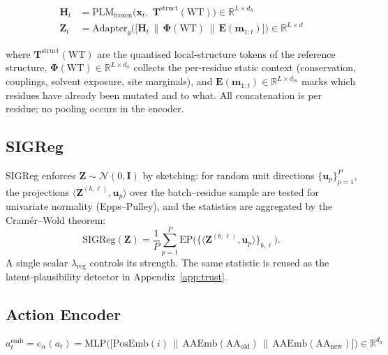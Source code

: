 \documentclass[12pt, a4paper]{article}
\begin{document}
\begin{align}
    \mathbf{H}_t &= \mathrm{PLM}_{\text{frozen}}\big(\mathbf{x}_t,\; \mathbf{T}^{\text{struct}}(\mathrm{WT})\big) \in \mathbb{R}^{L \times d_h} \\
    \mathbf{Z}_t &= \mathrm{Adapter}_\theta\Big(\big[\mathbf{H}_t \,\|\, \boldsymbol{\Phi}(\mathrm{WT}) \,\|\, \mathbf{E}(\mathbf{m}_{1:t})\big]\Big) \in \mathbb{R}^{L \times d}
\end{align}

\noindent where $\mathbf{T}^{\text{struct}}(\mathrm{WT})$ are the quantised local-structure tokens of the reference structure, $\boldsymbol{\Phi}(\mathrm{WT}) \in \mathbb{R}^{L \times d_\phi}$ collects the per-residue static context (conservation, couplings, solvent exposure, site marginals), and $\mathbf{E}(\mathbf{m}_{1:t}) \in \mathbb{R}^{L \times d_m}$ marks which residues have already been mutated and to what. All concatenation is per residue; no pooling occurs in the encoder.

\subsection{SIGReg}

SIGReg \citep{maes2026leworldmodel} enforces $\mathbf{Z} \sim \mathcal{N}(0, \mathbf{I})$ by sketching: for random unit directions $\{\mathbf{u}_p\}_{p=1}^{P}$, the projections $\langle \mathbf{Z}^{(b,\ell)}, \mathbf{u}_p \rangle$ over the batch--residue sample are tested for univariate normality (Epps--Pulley), and the statistics are aggregated by the Cram\'{e}r--Wold theorem:
\begin{equation}
    \mathrm{SIGReg}(\mathbf{Z}) = \frac{1}{P}\sum_{p=1}^{P} \mathrm{EP}\Big(\big\{\langle \mathbf{Z}^{(b,\ell)}, \mathbf{u}_p\rangle\big\}_{b,\ell}\Big).
\end{equation}
A single scalar $\lambda_\text{reg}$ controls its strength. The same statistic is reused as the latent-plausibility detector in Appendix~\ref{app:trust}.

\subsection{Action Encoder}

\begin{equation}
    a_t^\text{emb} = e_\alpha(a_t) = \mathrm{MLP}\Big(\big[\mathrm{PosEmb}(i) \,\|\, \mathrm{AAEmb}(\mathrm{AA}_\text{old}) \,\|\, \mathrm{AAEmb}(\mathrm{AA}_\text{new})\big]\Big) \in \mathbb{R}^{d_a}
\end{equation}
\end{document}
